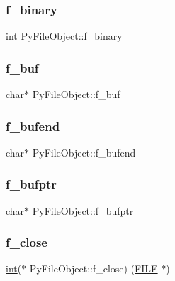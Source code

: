 \subsubsection{\texorpdfstring{f\_binary}{f\_binary}}
{\footnotesize\ttfamily \mbox{\hyperlink{warnings_8h_a74f207b5aa4ba51c3a2ad59b219a423b}{int}} Py\+File\+Object\+::f\+\_\+binary}

\mbox{\label{struct_py_file_object_a2f658596cca7f408a1ed89752934f4a6}} 
\subsubsection{\texorpdfstring{f\_buf}{f\_buf}}
{\footnotesize\ttfamily char$\ast$ Py\+File\+Object\+::f\+\_\+buf}

\mbox{\label{struct_py_file_object_a3f401303bf2674b1ab00abe3ccc84f35}} 
\subsubsection{\texorpdfstring{f\_bufend}{f\_bufend}}
{\footnotesize\ttfamily char$\ast$ Py\+File\+Object\+::f\+\_\+bufend}

\mbox{\label{struct_py_file_object_afb479571227a1dbe6606a6a69267f443}} 
\subsubsection{\texorpdfstring{f\_bufptr}{f\_bufptr}}
{\footnotesize\ttfamily char$\ast$ Py\+File\+Object\+::f\+\_\+bufptr}

\mbox{\label{struct_py_file_object_a3765ac4bab8a6a36eb97a096d1e65242}} 
\subsubsection{\texorpdfstring{f\_close}{f\_close}}
{\footnotesize\ttfamily \mbox{\hyperlink{warnings_8h_a74f207b5aa4ba51c3a2ad59b219a423b}{int}}($\ast$ Py\+File\+Object\+::f\+\_\+close) (\mbox{\hyperlink{fileobject_8h_ae8a16e073fe79a434049ae0c07f71fd3}{F\+I\+LE}} $\ast$)}

